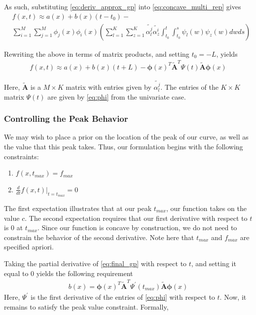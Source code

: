 As such, substituting \eqref{eq:deriv_approx_gp} into \eqref{eq:concave_multi_rep} gives
\begin{align}
    & f(x,t) \approx a(x) + b(x)(t-t_0) -  \nonumber \\
    & \sum_{i=1}^M \sum_{j=1}^M \phi_j(x)\phi_i(x) (\sum_{l=1}^K \sum_{z=1}^K\tilde{\alpha_l^j} \tilde{\alpha_z^i}  \int_{t_0}^t \int_{t_0}^s \psi_l(w)\psi_z(w)  dwds)
\end{align}
 

Rewriting the above in terms of matrix products, and setting $t_0 = -L$,  yields
\begin{align}
\label{eq:final_gp_app}
    f(x,t) \approx a(x) + b(x)(t+L) -  \mathbf{\phi}(x)^T\mathbf{\tilde{A}}^T \Psi(t) \mathbf{\tilde{A}} \mathbf{\phi}(x)
\end{align} 


Here, $\mathbf{\tilde{A}}$ is a $M \times K$ matrix with entries given by $\tilde{\alpha_l^j}$. 
The entries of the $K \times K$ matrix $\Psi(t)$ are given by \ref{eq:phi} from the univariate case. 




\subsubsection{Controlling the Peak Behavior}
\label{appendix:peak_value}
We may wish to place a prior on the location of the peak of our curve, as well as the value that this peak takes. Thus, our formulation begins with the following constraints:
\begin{enumerate}
    \item $f(x,t_{max}) = f_{max}$
    \item $\frac{d}{dt} f(x,t) |_{t = t_{max}} = 0$
\end{enumerate}

The first expectation illustrates that at our peak $t_{max}$, our function takes on the value $c$. The second expectation requires that our first derivative with respect to $t$ is 0 at $t_{max}$. Since our function is concave by construction, we do not need to constrain the behavior of the second derivative. Note here that $t_{max}$ and $f_{max}$ are specified apriori.


Taking the partial derivative of \eqref{eq:final_gp} with respect to $t$, and setting it equal to 0 yields the following requirement
\begin{align}
\label{eq:first_deriv_constraint}
    b(x) = \mathbf{\phi}(x)^T\mathbf{\tilde{A}}^T \Psi^{'}(t_{max}) \mathbf{\tilde{A}} \mathbf{\phi}(x)
\end{align}
Here, $\Psi^{'}$ is the first derivative of the entries of \eqref{eq:phi} with respect to $t$. 
Now, it remains to satisfy the peak value constraint. Formally,

